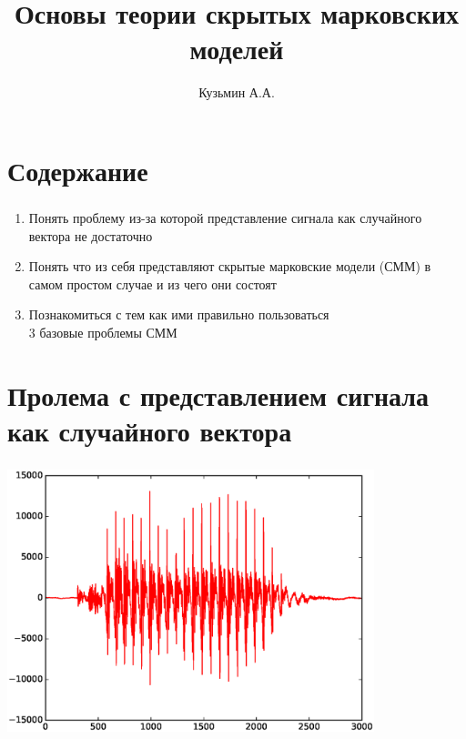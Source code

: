 \documentclass{beamer}
\title{Основы теории скрытых марковских моделей}
\author{Кузьмин А.А.}
\institute[]{\url{http://rfe.bsu.by/}}
\begin{document}
\begin{frame}
  \maketitle
\end{frame}

\section{Содержание}
\begin{frame} \label{cont}
  \frametitle{\insertsection}
  \begin{enumerate}
    \item Понять проблему из-за которой представление сигнала как случайного вектора не достаточно \pause
    \item Понять что из себя представляют \alert{скрытые марковские модели (СММ)} в самом простом случае и из чего они состоят\pause
    \item Познакомиться с тем как ими правильно пользоваться \\
      \pause \alert{$3$ базовые проблемы СММ}
  \end{enumerate}
\end{frame}

\section{Пролема с представлением сигнала как случайного вектора}
\begin{frame}
  \frametitle{\insertsection}
  \includegraphics[width=0.8\textwidth]{a_short.eps}
\end{frame}
\end{document}
